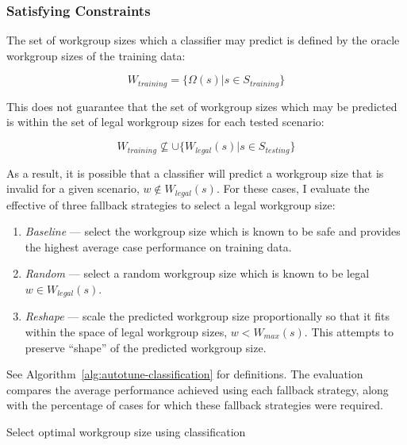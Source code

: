 \subsubsection{Satisfying Constraints}

The set of workgroup sizes which a classifier may predict is defined
by the oracle workgroup sizes of the training data:

\begin{equation}
W_{training} = \{ \Omega(s) | s \in S_{training} \}
\end{equation}

This does not guarantee that the set of workgroup sizes which may be
predicted is within the set of legal workgroup sizes for each tested
scenario:

\begin{equation}
W_{training} \nsubseteq \cup \{ W_{legal}(s) | s \in S_{testing} \}
\end{equation}


As a result, it is possible that a classifier will predict a workgroup
size that is invalid for a given scenario, $w \not\in W_{legal}(s)$.
For these cases, I evaluate the effective of three fallback strategies
to select a legal workgroup size:

\begin{enumerate}
\item \emph{Baseline} --- select the workgroup size which is known to
  be safe and provides the highest average case performance on
  training data.
\item \emph{Random} --- select a random workgroup size which is known
  to be legal $w \in W_{legal}(s)$.
\item \emph{Reshape} --- scale the predicted workgroup size
  proportionally so that it fits within the space of legal workgroup
  sizes, $w < W_{max}(s)$. This attempts to preserve ``shape'' of the
  predicted workgroup size.
\end{enumerate}

See Algorithm~\ref{alg:autotune-classification} for definitions. The
evaluation compares the average performance achieved using each
fallback strategy, along with the percentage of cases for which these
fallback strategies were required.


\begin{algorithm}

\caption{Select optimal workgroup size using classification}
\label{alg:autotune-classification}
\end{algorithm}


